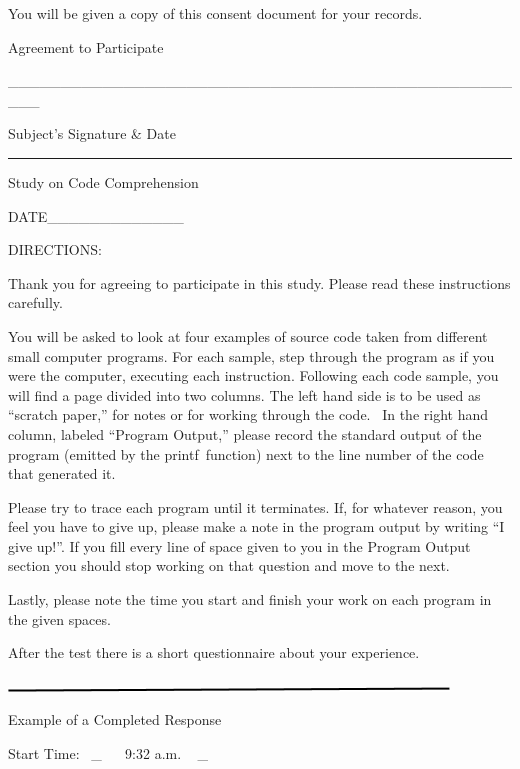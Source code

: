 \documentclass[]{article}
\begin{document}
{You will be given a copy of this consent document for your records.}

{Agreement to Participate}

{\_\_\_\_\_\_\_\_\_\_\_\_\_\_\_\_\_\_\_\_\_\_\_\_\_\_\_\_\_\_\_\_\_\_\_\_\_\_\_\_\_\_\_\_\_\_\_\_\_\_\_}

{Subject's Signature \& Date}

\begin{center}\rule{0.5\linewidth}{\linethickness}\end{center}

{Study on Code Comprehension}

{DATE\_\_\_\_\_\_\_\_\_\_\_\_\_~~~~~~~~~~~~~~~~~~~~~~~~~~~~~~~~~~~~~~~~}


{DIRECTIONS:}

{Thank you for agreeing to participate in this study. Please read these
instructions carefully.}

{You will be asked to look at four examples of source code taken from
different small computer programs. For each sample, }{step through the
program as if you were the computer, executing each instruction.
Following each code sample, you will find a page divided into two
columns. The left hand side is to be used as ``scratch paper,'' for
notes or for working through the code. ~In the right hand column,
labeled ``Program Output,'' please record the standard output of the
program (emitted by the }{printf}{~function) next to the line number of
the code that generated it.}

Please try to trace each program until it terminates. If, for whatever reason, you feel you have to give up, please make a note in the program output by writing “I give up!”. If you fill every line of space given to you in the Program Output section you should stop working on that question and move to the next.

Lastly, please note the time you start and finish your work on each program in the given spaces.

After the test there is a short questionnaire about your experience.


{\includegraphics{images/image00.png}}

{}

{}

{Example of a Completed Response}

{}

{Start Time}{: ~}{\_ ~ ~9:32 a.m. ~ \_}{~~~~~~~~~~~~~~~~}
\end{document}
